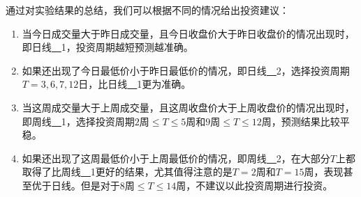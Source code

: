 通过对实验结果的总结，我们可以根据不同的情况给出投资建议：
\begin{enumerate}
    \item 当今日成交量大于昨日成交量，且今日收盘价大于昨日收盘价的情况出现时，即日线\underline{~~}1，投资周期越短预测越准确。
    \item 如果还出现了今日最低价小于昨日最低价的情况，即日线\underline{~~}2，选择投资周期$T=3,6,7,12\text{日}$，比日线\underline{~~}1更为准确。
    \item 当这周成交量大于上周成交量，且这周收盘价大于上周收盘价的情况出现时，即周线\underline{~~}1，选择投资周期$2\text{周}\leq T\leq5\text{周}$和$9\text{周}\leq T\leq12\text{周}$，预测结果比较平稳。
    \item 如果还出现了这周最低价小于上周最低价的情况，即周线\underline{~~}2，在大部分$T$上都取得了比周线\underline{~~}1更好的结果，尤其值得注意的是$T=2\text{周}$和$T=15\text{周}$，表现甚至优于日线。但是对于$8\text{周}\leq T\leq14\text{周}$，不建议以此投资周期进行投资。
\end{enumerate}